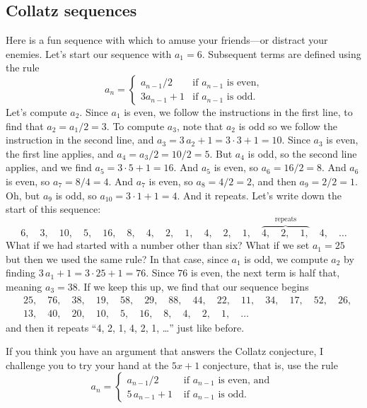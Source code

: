 \documentclass{ximera}
\begin{document}
\subsection{Collatz sequences}

Here is a fun sequence with which to amuse your friends---or distract
your enemies.  Let's start our sequence with $a_1 = 6$.  Subsequent
terms are defined using the rule
\[
a_n =
\begin{cases}
  a_{n-1} / 2 &\text{if $a_{n-1}$ is even,} \\
  3a_{n-1} + 1 &\text{if $a_{n-1}$ is odd.}
\end{cases}
\]
Let's compute $a_2$.  Since $a_1$ is even, we follow the instructions
in the first line, to find that $a_2 = a_1/2 = 3$. To compute $a_3$,
note that $a_2$ is odd so we follow the instruction in the second
line, and $a_3 = 3 \, a_2 + 1 = 3 \cdot 3 + 1 = 10$.  Since $a_3$ is
even, the first line applies, and $a_4 = a_3 / 2 = 10 / 2 = 5$.  But
$a_4$ is odd, so the second line applies, and we find $a_5 = 3 \cdot 5
+ 1 = 16$.  And $a_5$ is even, so $a_6 = 16 / 2 = 8$.  And $a_6$ is
even, so $a_7 = 8/4 = 4$.  And $a_7$ is even, so $a_8 = 4 / 2 = 2$,
and then $a_9 = 2/2 = 1$.  Oh, but $a_9$ is odd, so $a_{10} = 3 \cdot
1 + 1 = 4$.  And it repeats.  Let's write down the start of this sequence:
$$
6,\quad %
3,\quad %
10,\quad  %
5,\quad  %
16,\quad  %
8,\quad  %
4,\quad  %
2,\quad  %
1,\quad  %
4,\quad %
2,\quad %
1,\quad %
\overbrace{4,\quad %
2,\quad %
1,}^{\text{repeats}}\quad %
4,\quad %
\ldots
$$
What if we had started with a number other than six?  What if we set
$a_1 = 25$ but then we used the same rule?  In that case, since $a_1$
is odd, we compute $a_2$ by finding $3 \, a_1 + 1 = 3 \cdot 25 + 1 =
76$.  Since $76$ is even, the next term is half that, meaning $a_3 =
38$.  If we keep this up, we find that our sequence begins
\begin{align*}
&25,\quad 76,\quad 38,\quad 19,\quad 58,\quad 29,\quad 88,\quad 44,\quad 22,\quad 11,\quad 34,\quad 17,\quad 52,\quad 26, \\
&13,\quad 40,\quad 20,\quad 10,\quad 5,\quad 16,\quad 8,\quad 4,\quad 2, \quad 1, \quad \ldots
\end{align*}
and then it repeats ``4, 2, 1, 4, 2, 1, \ldots'' just like before.

If you think you have an argument that answers the Collatz conjecture, I challenge you to try your hand at the $5x+1$ conjecture, that is, use the rule
\[
a_n = \begin{cases} a_{n-1} / 2 & \text{ if $a_{n-1}$ is even, and } \\
5 \, a_{n-1} + 1 & \text{ if $a_{n-1}$ is odd.}
\end{cases}
\]
\end{document}
